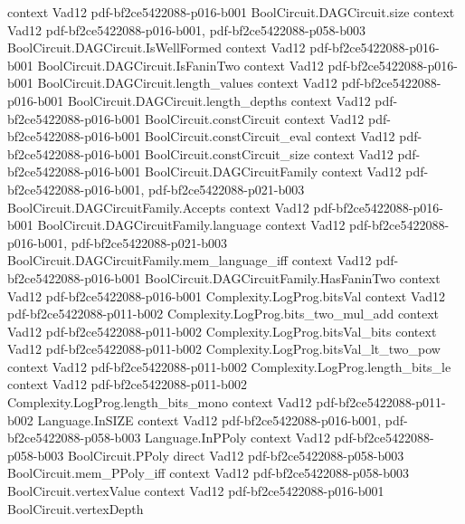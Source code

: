 \begin{theorem}
  {context}
  {Vad12}
  {pdf-bf2ce5422088-p016-b001}
\proofstep
  {BoolCircuit.DAGCircuit.size}
  {context}
  {Vad12}
  {pdf-bf2ce5422088-p016-b001,
    pdf-bf2ce5422088-p058-b003}
\proofstep
  {BoolCircuit.DAGCircuit.IsWellFormed}
  {context}
  {Vad12}
  {pdf-bf2ce5422088-p016-b001}
\proofstep
  {BoolCircuit.DAGCircuit.IsFaninTwo}
  {context}
  {Vad12}
  {pdf-bf2ce5422088-p016-b001}
\proofstep
  {BoolCircuit.DAGCircuit.length_values}
  {context}
  {Vad12}
  {pdf-bf2ce5422088-p016-b001}
\proofstep
  {BoolCircuit.DAGCircuit.length_depths}
  {context}
  {Vad12}
  {pdf-bf2ce5422088-p016-b001}
\proofstep
  {BoolCircuit.constCircuit}
  {context}
  {Vad12}
  {pdf-bf2ce5422088-p016-b001}
\proofstep
  {BoolCircuit.constCircuit_eval}
  {context}
  {Vad12}
  {pdf-bf2ce5422088-p016-b001}
\proofstep
  {BoolCircuit.constCircuit_size}
  {context}
  {Vad12}
  {pdf-bf2ce5422088-p016-b001}
\proofstep
  {BoolCircuit.DAGCircuitFamily}
  {context}
  {Vad12}
  {pdf-bf2ce5422088-p016-b001,
    pdf-bf2ce5422088-p021-b003}
\proofstep
  {BoolCircuit.DAGCircuitFamily.Accepts}
  {context}
  {Vad12}
  {pdf-bf2ce5422088-p016-b001}
\proofstep
  {BoolCircuit.DAGCircuitFamily.language}
  {context}
  {Vad12}
  {pdf-bf2ce5422088-p016-b001,
    pdf-bf2ce5422088-p021-b003}
\proofstep
  {BoolCircuit.DAGCircuitFamily.mem_language_iff}
  {context}
  {Vad12}
  {pdf-bf2ce5422088-p016-b001}
\proofstep
  {BoolCircuit.DAGCircuitFamily.HasFaninTwo}
  {context}
  {Vad12}
  {pdf-bf2ce5422088-p016-b001}
\proofstep
  {Complexity.LogProg.bitsVal}
  {context}
  {Vad12}
  {pdf-bf2ce5422088-p011-b002}
\proofstep
  {Complexity.LogProg.bits_two_mul_add}
  {context}
  {Vad12}
  {pdf-bf2ce5422088-p011-b002}
\proofstep
  {Complexity.LogProg.bitsVal_bits}
  {context}
  {Vad12}
  {pdf-bf2ce5422088-p011-b002}
\proofstep
  {Complexity.LogProg.bitsVal_lt_two_pow}
  {context}
  {Vad12}
  {pdf-bf2ce5422088-p011-b002}
\proofstep
  {Complexity.LogProg.length_bits_le}
  {context}
  {Vad12}
  {pdf-bf2ce5422088-p011-b002}
\proofstep
  {Complexity.LogProg.length_bits_mono}
  {context}
  {Vad12}
  {pdf-bf2ce5422088-p011-b002}
\proofstep
  {Language.InSIZE}
  {context}
  {Vad12}
  {pdf-bf2ce5422088-p016-b001,
    pdf-bf2ce5422088-p058-b003}
\proofstep
  {Language.InPPoly}
  {context}
  {Vad12}
  {pdf-bf2ce5422088-p058-b003}
\proofstep
  {BoolCircuit.PPoly}
  {direct}
  {Vad12}
  {pdf-bf2ce5422088-p058-b003}
\proofstep
  {BoolCircuit.mem_PPoly_iff}
  {context}
  {Vad12}
  {pdf-bf2ce5422088-p058-b003}
\proofstep
  {BoolCircuit.vertexValue}
  {context}
  {Vad12}
  {pdf-bf2ce5422088-p016-b001}
\proofstep
  {BoolCircuit.vertexDepth}

\end{theorem}
